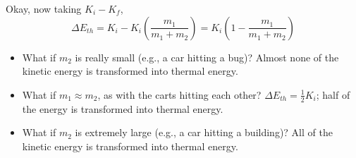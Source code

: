 Okay, now taking $K_i-K_f$,
$$\Delta{E_{th}}=K_i-K_i\left(\frac{m_1}{m_1+m_2}\right)=\boxed{K_i\left(1-\frac{m_1}{m_1+m_2}\right)}$$

\begin{itemize}
\item What if $m_2$ is really small (e.g., a car hitting a bug)? Almost none of the kinetic energy is transformed into thermal energy.
\item What if $m_1\approx m_2$, as with the carts hitting each other? $\Delta E_{th}=\frac{1}{2}K_i$; half of the energy is transformed into thermal energy.
\item What if $m_2$ is extremely large (e.g., a car hitting a building)? All of the kinetic energy is transformed into thermal energy.
\end{itemize}

\clearpage
